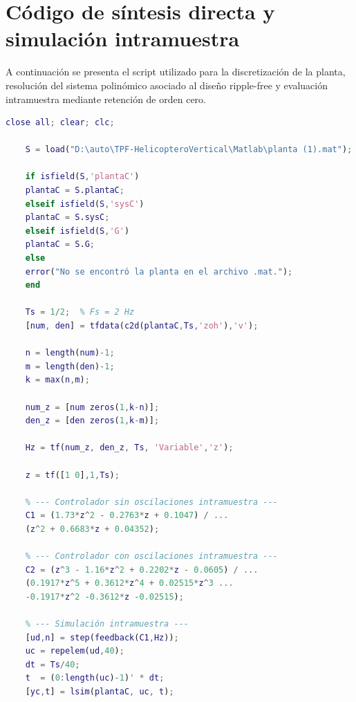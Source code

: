 \section{Código de síntesis directa y simulación intramuestra}
\label{ap:codigo_TR}

A continuación se presenta el script utilizado para la
discretización de la planta, resolución del sistema
polinómico asociado al diseño ripple-free y evaluación
intramuestra mediante retención de orden cero.

\begin{lstlisting}[language=Matlab]
	close all; clear; clc;
	
	S = load("D:\auto\TPF-HelicopteroVertical\Matlab\planta (1).mat");
	
	if isfield(S,'plantaC')
	plantaC = S.plantaC;
	elseif isfield(S,'sysC')
	plantaC = S.sysC;
	elseif isfield(S,'G')
	plantaC = S.G;
	else
	error("No se encontró la planta en el archivo .mat.");
	end
	
	Ts = 1/2;  % Fs = 2 Hz
	[num, den] = tfdata(c2d(plantaC,Ts,'zoh'),'v');
	
	n = length(num)-1;
	m = length(den)-1;
	k = max(n,m);
	
	num_z = [num zeros(1,k-n)];
	den_z = [den zeros(1,k-m)];
	
	Hz = tf(num_z, den_z, Ts, 'Variable','z');
	
	z = tf([1 0],1,Ts);
	
	% --- Controlador sin oscilaciones intramuestra ---
	C1 = (1.73*z^2 - 0.2763*z + 0.1047) / ...
	(z^2 + 0.6683*z + 0.04352);
	
	% --- Controlador con oscilaciones intramuestra ---
	C2 = (z^3 - 1.16*z^2 + 0.2202*z - 0.0605) / ...
	(0.1917*z^5 + 0.3612*z^4 + 0.02515*z^3 ...
	-0.1917*z^2 -0.3612*z -0.02515);
	
	% --- Simulación intramuestra ---
	[ud,n] = step(feedback(C1,Hz));
	uc = repelem(ud,40);
	dt = Ts/40;
	t  = (0:length(uc)-1)' * dt;
	[yc,t] = lsim(plantaC, uc, t);
\end{lstlisting}
